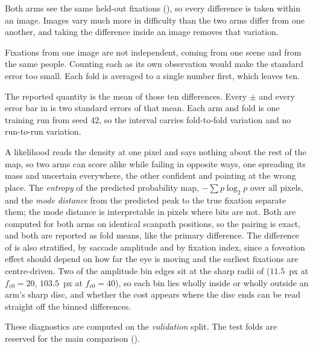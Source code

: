 Both arms see the same held-out fixations (), so every difference is taken within an
image. Images vary much more in difficulty than the two arms differ from one another, and taking the
difference inside an image removes that variation.

Fixations from one image are not independent, coming from one scene and from the same people. Counting
each as its own observation would make the standard error too small. Each fold is averaged to a single
number first, which leaves ten.

The reported quantity is the mean of those ten differences. Every $\pm$ and every error bar in
 is two standard errors of that mean.
Each arm and fold is one training run from seed $42$, so the interval carries fold-to-fold variation and
no run-to-run variation.

A likelihood reads the density at one pixel and says nothing about the rest of the map, so two arms can
score alike while failing in opposite ways, one spreading its mass and uncertain everywhere, the other
confident and pointing at the wrong place.
The \emph{entropy} of the predicted probability map, $-\sum p \log_2 p$ over all pixels, and the
\emph{mode distance} from the predicted peak to the true fixation separate them; the mode distance is
interpretable in pixels where bits are not.
Both are computed for both arms on identical scanpath positions, so the pairing is exact, and both are
reported as fold means, like the primary difference.
The difference of  is also stratified, by saccade amplitude and by fixation index,
since a foveation effect should depend on how far the eye is moving and the earliest fixations are
centre-driven.
Two of the amplitude bin edges sit at the sharp radii of  ($11.5$~px at
$f_{c0} = 20$, $103.5$~px at $f_{c0} = 40$), so each bin lies wholly inside or wholly outside an arm's
sharp disc, and whether the cost appears where the disc ends can be read straight off the binned
differences.

These diagnostics are computed on the \emph{validation} split.
The test folds are reserved for the main comparison ().



